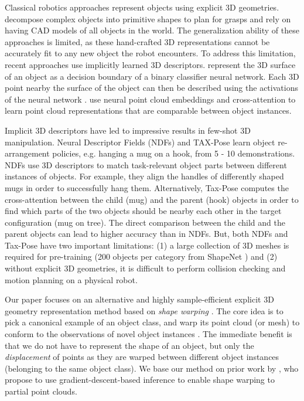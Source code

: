 \documentclass{article}
\newcommand{\tk}[1]{\textcolor{magenta}{[\textbf{TK:} #1]}}
\begin{document}
Classical robotics approaches represent objects using explicit 3D geometries. \citet{miller03automatic,tenorth13decomposing} decompose complex objects into primitive shapes to plan for grasps and \citet{klank09realtime,beetz11robotic} rely on having CAD models of all objects in the world. The generalization ability of these approaches is limited, as these hand-crafted 3D representations cannot be accurately fit to any new object the robot encounters. To address this limitation, recent approaches use implicitly learned 3D descriptors. \citet{mescheder19occupancy,park19deepsdf} represent the 3D surface of an object as a decision boundary of a binary classifier neural network. Each 3D point nearby the surface of the object can then be described using the activations of the neural network \cite{simeonov22neural}. \citet{pan22taxpose} use neural point cloud embeddings \cite{qi17pointneta} and cross-attention \cite{vaswani17attention} to learn point cloud representations that are comparable between object instances.

Implicit 3D descriptors have led to impressive results in few-shot 3D manipulation. Neural Descriptor Fields (NDFs) \cite{simeonov22neural,simeonov22se} and TAX-Pose \cite{pan22taxpose} learn object re-arrangement policies, e.g. hanging a mug on a hook, from 5 - 10 demonstrations. NDFs use 3D descriptors to match task-relevant object parts between different instances of objects. For example, they align the handles of differently shaped mugs in order to successfully hang them. Alternatively, Tax-Pose computes the cross-attention between the child (mug) and the parent (hook) objects in order to find which parts of the two objects should be nearby each other in the target configuration (mug on tree). The direct comparison between the child and the parent objects can lead to higher accuracy than in NDFs. But, both NDFs and Tax-Pose have two important limitations: (1) a large collection of 3D meshes is required for pre-training (200 objects per category from ShapeNet \cite{chang15shapenet}) and (2) without explicit 3D geometries, it is difficult to perform collision checking and motion planning on a physical robot.

Our paper focuses on an alternative and highly sample-efficient explicit 3D geometry representation method based on \textit{shape warping} \citep{jakel12learning,brandi14generalizing,lee15learning,schulman16learning,rodriguez18transferring,rodriguez18transferringa,thompson21shapebased}. The core idea is to pick a canonical example of an object class, and warp its point cloud (or mesh) to conform to the observations of novel object instances \cite{myronenko10pointset,hillenbrand12transferring,benamor12generalization}. The immediate benefit is that we do not have to represent the shape of an object, but only the \textit{displacement} of points as they are warped between different object instances (belonging to the same object class). We base our method on prior work by \citet{rodriguez18transferring,thompson21shapebased}, who propose to use gradient-descent-based inference to enable shape warping to partial point clouds.
\end{document}
